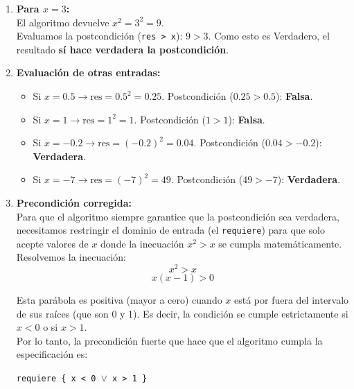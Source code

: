 \begin{enumerate}[label=\textbf{\alph*)}]

    \item \textbf{Para $x = 3$:} \\
    El algoritmo devuelve $x^2 = 3^2 = 9$. \\
    Evaluamos la postcondición (\texttt{res > x}): $9 > 3$. Como esto es Verdadero, el resultado \textbf{sí hace verdadera la postcondición}.

    \vspace{0.4cm}
    \item \textbf{Evaluación de otras entradas:}
    \begin{itemize}
        \item Si $x = 0.5 \rightarrow \text{res} = 0.5^2 = 0.25$. Postcondición ($0.25 > 0.5$): \textbf{Falsa}.
        \item Si $x = 1 \rightarrow \text{res} = 1^2 = 1$. Postcondición ($1 > 1$): \textbf{Falsa}.
        \item Si $x = -0.2 \rightarrow \text{res} = (-0.2)^2 = 0.04$. Postcondición ($0.04 > -0.2$): \textbf{Verdadera}.
        \item Si $x = -7 \rightarrow \text{res} = (-7)^2 = 49$. Postcondición ($49 > -7$): \textbf{Verdadera}.
    \end{itemize}

    \vspace{0.4cm}
    \item \textbf{Precondición corregida:} \\
    Para que el algoritmo siempre garantice que la postcondición sea verdadera, necesitamos restringir el dominio de entrada (el \texttt{requiere}) para que solo acepte valores de $x$ donde la inecuación $x^2 > x$ se cumpla matemáticamente. \\
    
    Resolvemos la inecuación:
    $$x^2 > x$$
    $$x(x - 1) > 0$$
    
    Esta parábola es positiva (mayor a cero) cuando $x$ está por fuera del intervalo de sus raíces (que son 0 y 1). Es decir, la condición se cumple estrictamente si $x < 0$ o si $x > 1$. \\
    Por lo tanto, la precondición fuerte que hace que el algoritmo cumpla la especificación es:
    
    \begin{center}
    \texttt{requiere \{ x < 0 $\vee$ x > 1 \}}
    \end{center}

\end{enumerate}

